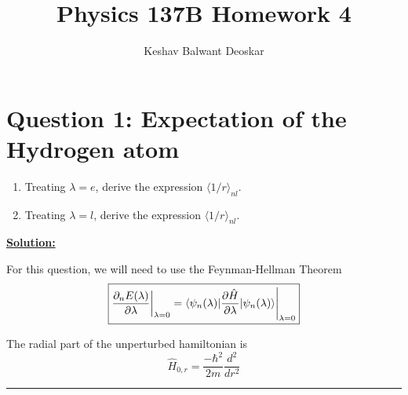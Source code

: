 \documentclass{article}
\title{Physics 137B Homework 4}
\author{Keshav Balwant Deoskar}
\newcommand{\inner}[2]{\langle #1 | #2 \rangle}
\newcommand{\mean}[1]{\langle #1 \rangle}
\newcommand{\restr}[2]{{%
  \left.\kern-\nulldelimiterspace %
  #1 %
  \vphantom{\big|} %
  \right|_{#2} %
  }}
\begin{document}
\maketitle

\section*{Question 1: Expectation of the Hydrogen atom}

\begin{enumerate}[label=(\alph*)]
  \item Treating $\lambda = e$, derive the expression $\mean{1/r}_{nl}$.
  \item Treating $\lambda = l$, derive the expression $\mean{1/r}_{nl}$.
\end{enumerate}

\vskip 0.5cm
\underline{\textbf{Solution:}} 

For this question, we will need to use the Feynman-Hellman Theorem 
\[  \boxed{ \restr{\frac{\partial_n E(\lambda)}{\partial \lambda}}{\lambda = 0} = \restr{\inner{\psi_n(\lambda)}{ \frac{\partial \hat{H}}{\partial \lambda} \lvert \psi_n(\lambda)}}{\lambda = 0} }  \]

The radial part of the unperturbed hamiltonian is 
\[ \hat{H}_{0, r} = \frac{-\hbar^2}{2m} \frac{d^2}{dr^2}  \] 

\vskip 0.5cm


\vskip 0.5cm 
\hrule 
\vskip 0.5cm






\end{document}
